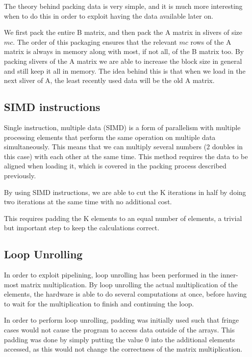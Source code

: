\documentclass[a4paper,11pt,oneside]{book}
\begin{document}
The theory behind packing data is very simple, and it is much more interesting when to do this in order to exploit having the data available later on. 

We first pack the entire B matrix, and then pack the A matrix in slivers of size $mc$. The order of this packaging ensures that the relevant $mc$ rows of the A matrix is always in memory along with most, if not all, of the B matrix too. By packing slivers of the A matrix we are able to increase the block size in general and still keep it all in memory. The idea behind this is that when we load in the next sliver of A, the least recently used data will be the old A matrix. %

\subsection{SIMD instructions}
Single instruction, multiple data (SIMD) is a form of parallelism with multiple processing elements that perform the same operation on multiple data simultaneously. This means that we can multiply several numbers (2 doubles in this case) with each other at the same time. This method requires the data to be aligned when loading it, which is covered in the packing process described previously.

By using SIMD instructions, we are able to cut the K iterations in half by doing two iterations at the same time with no additional cost. %

This requires padding the K elements to an equal number of elements, a trivial but important step to keep the calculations correct.

\subsection{Loop Unrolling}
In order to exploit pipelining, loop unrolling has been performed in the inner-most matrix multiplication. By loop unrolling the actual multiplication of the elements, the hardware is able to do several computations at once, before having to wait for the multiplication to finish and continuing the loop.


In order to perform loop unrolling, padding was initially used such that fringe cases would not cause the program to access data outside of the arrays. This padding was done by simply putting the value 0 into the additional elements accessed, as this would not change the correctness of the matrix multiplication.
\end{document}
